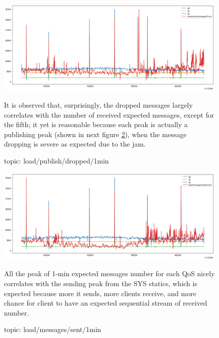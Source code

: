 \documentclass[12pt, letterpaper]{article}
\begin{document}
\begin{figure}
	\setlength{\tabcolsep}{0pt}
	\caption{topic: load/publish/dropped/1min}
	\label{f:valid_cnt_load_publish_dropped_1min}
	\begin{center}
	
		\includegraphics[width=\textwidth]{valid_cnt/valid_cnt-load_publish_dropped_1min}
	
	\end{center}
	It is observed that, surprisingly, the dropped messages largely correlates with the number of received expected messages, except for the fifth; it yet is reasonable because each peak is actually a publishing peak (shown in next figure \ref{f:valid_cnt_load_messages_sent_1min}), when the message dropping is severe as expected due to the jam.
\end{figure}

\begin{figure}
	\caption{topic: load/messages/sent/1min}
	\label{f:valid_cnt_load_messages_sent_1min}
	\begin{center}
		\includegraphics[width=\textwidth]{valid_cnt/valid_cnt-load_messages_sent_1min}
	\end{center}
	All the peak of 1-min expected messages number for each QoS nicely correlates with the sending peak from the SYS statics, which is expected because more it sends, more clients receive, and more chance for client to have an expected  sequential stream of received number.
\end{figure}
\end{document}

